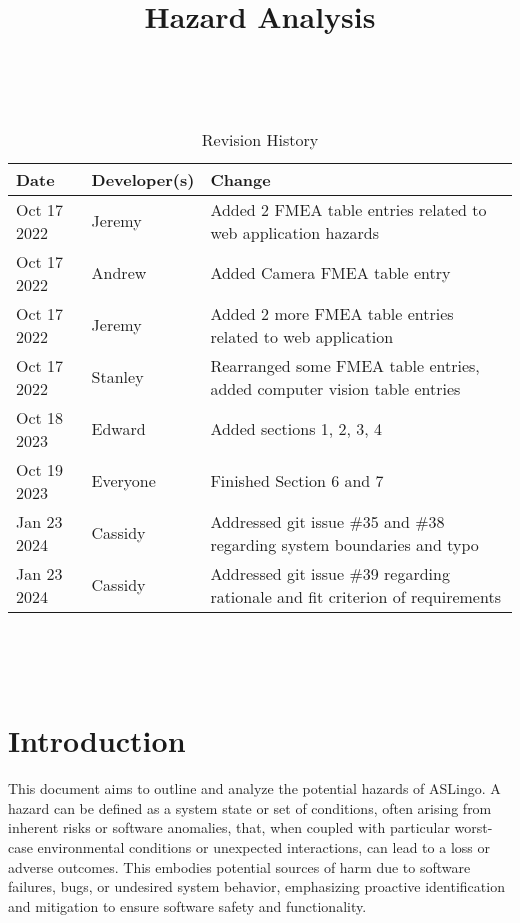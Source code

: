 \documentclass{article}
\title{Hazard Analysis\\\progname}
\author{\authname}
\date{}
\begin{document}
\maketitle
\thispagestyle{empty}

~\newpage


\begin{table}[hp]
\caption{Revision History} \label{TblRevisionHistory}
\begin{tabularx}{\textwidth}{llX}
\toprule
\textbf{Date} & \textbf{Developer(s)} & \textbf{Change}\\
\midrule
Oct 17 2022 & Jeremy & Added 2 FMEA table entries related to web application hazards\\
Oct 17 2022 & Andrew & Added Camera FMEA table entry\\
Oct 17 2022 & Jeremy & Added 2 more FMEA table entries related to web application\\
Oct 17 2022 & Stanley & Rearranged some FMEA table entries, added computer vision table entries\\
Oct 18 2023 & Edward & Added sections 1, 2, 3, 4\\
Oct 19 2023 & Everyone & Finished Section 6 and 7 \\
Jan 23 2024 & Cassidy & Addressed git issue \#35 and \#38 regarding system boundaries and typo \\
Jan 23 2024 & Cassidy & Addressed git issue \#39 regarding rationale and fit criterion of requirements \\
\bottomrule
\end{tabularx}
\end{table}

~\newpage

\tableofcontents

~\newpage


\section{Introduction}
This document aims to outline and analyze the potential hazards of ASLingo. A hazard can be defined as a system state or set of conditions, often arising from inherent risks or software anomalies, that, when coupled with particular worst-case environmental conditions or unexpected interactions, can lead to a loss or adverse outcomes. This embodies potential sources of harm due to software failures, bugs, or undesired system behavior, emphasizing proactive identification and mitigation to ensure software safety and functionality.
\end{document}
